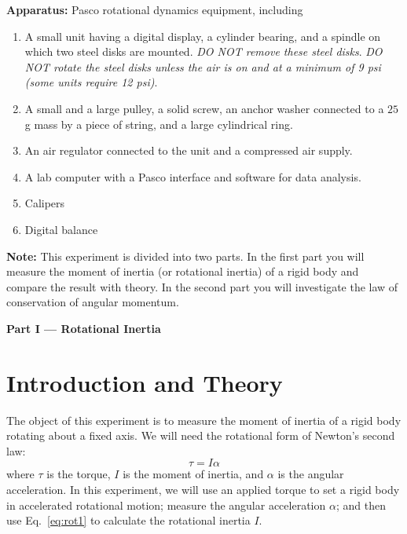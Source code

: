 \newexp


{\bf Apparatus:  }Pasco rotational dynamics equipment, including
\begin{enumerate}
\item A small unit having a digital display, a cylinder bearing, and a
spindle on which two steel disks are mounted.  {\em DO NOT remove these steel
disks}.  {\em DO NOT rotate the steel disks unless the air is on and at a minimum
of 9 psi (some units require 12 psi)}.
\item A small and a large pulley, a solid screw, an anchor washer connected to
a $25 \:$g mass by a piece of string, and a large cylindrical ring.
\item An air regulator connected to the unit and a compressed air supply.
\item A lab computer with a Pasco interface and software for data analysis.
\item Calipers
\item Digital balance
\end{enumerate}


{\bf Note:  }This experiment is divided into two parts.  In the first
part you will measure
the moment of inertia (or rotational inertia) of a rigid body and
compare the result with theory. In the second
part you will investigate the law of conservation of angular momentum.

\begin{center}
{\Large {\bf Part I --- Rotational Inertia}}
\end{center}

\section*{Introduction and Theory}
The object of this experiment is to measure the moment of inertia of
a rigid body rotating about a fixed axis.  We will need
the rotational form of Newton's second law:
\begin{equation}
{\tau} = I {\alpha}  \label{eq:rot1}
\end{equation}
where ${\tau}$ is the torque, $I$ is the moment of inertia, and
${\alpha}$ is the angular acceleration.  In this experiment, we
will use an applied torque to set a rigid body in accelerated
rotational motion; measure the
angular acceleration $\alpha$; and then use Eq.~\ref{eq:rot1} to
calculate the rotational inertia $I$.

